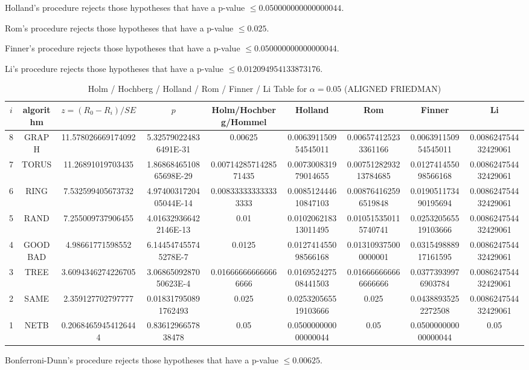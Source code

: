 \documentclass[a4paper,10pt]{article}
\begin{document}
\begin{landscape}
Holland's procedure rejects those hypotheses that have a p-value $\le0.050000000000000044$.


Rom's procedure rejects those hypotheses that have a p-value $\le0.025$.


Finner's procedure rejects those hypotheses that have a p-value $\le0.050000000000000044$.


Li's procedure rejects those hypotheses that have a p-value $\le0.012094954133873176$.



\newpage

\begin{table}[!htp]
\centering\scriptsize
\caption{Holm / Hochberg / Holland / Rom / Finner / Li Table for $\alpha=0.05$ (ALIGNED FRIEDMAN)}
\begin{tabular}{ccccccccc}
$i$&algorithm&$z=(R_0 - R_i)/SE$&$p$&Holm/Hochberg/Hommel&Holland&Rom&Finner&Li\\
\hline
8& GRAPH&11.578026669174092&5.325790224836491E-31&0.00625&0.006391150954545011&0.006574125233361166&0.006391150954545011&0.008624754432429061\\
7& TORUS&11.26891019703435&1.8686846510865698E-29&0.0071428571428571435&0.007300831979014655&0.0075128293213784685&0.012741455098566168&0.008624754432429061\\
6& RING&7.532599405673732&4.9740031720405044E-14&0.008333333333333333&0.008512444610847103&0.008764162596519848&0.019051173490195694&0.008624754432429061\\
5& RAND&7.255009737906455&4.016329366422146E-13&0.01&0.010206218313011495&0.010515350115740741&0.025320565519103666&0.008624754432429061\\
4& GOODBAD&4.98661771598552&6.144547455745278E-7&0.0125&0.012741455098566168&0.013109375000000001&0.031549888917161595&0.008624754432429061\\
3& TREE&3.6094346274226705&3.0686509287050623E-4&0.016666666666666666&0.016952427508441503&0.016666666666666666&0.03773939976903784&0.008624754432429061\\
2& SAME&2.359127702797777&0.018317950891762493&0.025&0.025320565519103666&0.025&0.04388935252272508&0.008624754432429061\\
1& NETB&0.20684659454126444&0.8361296657838478&0.05&0.050000000000000044&0.05&0.050000000000000044&0.05\\
\hline
\end{tabular}
\end{table}
Bonferroni-Dunn's procedure rejects those hypotheses that have a p-value $\le0.00625$.



\end{landscape}
\end{document}

